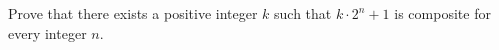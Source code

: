 Prove that there exists a positive integer $k$ such that $k\cdot2^n+1$ is composite for every integer $n$.